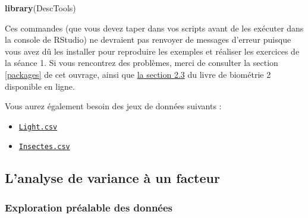 \documentclass[
  a4paper,
]{article}
\newenvironment{Shaded}{\begin{snugshade}}{\end{snugshade}}
\newcommand{\KeywordTok}[1]{\textcolor[rgb]{0.12,0.11,0.11}{\textbf{#1}}}
\newcommand{\NormalTok}[1]{\textcolor[rgb]{0.12,0.11,0.11}{#1}}
\providecommand{\tightlist}{%
  \setlength{\itemsep}{0pt}\setlength{\parskip}{0pt}}
\begin{document}
\begin{Shaded}
\begin{Highlighting}[]
\KeywordTok{library}\NormalTok{(DescTools)}
\end{Highlighting}
\end{Shaded}

Ces commandes (que vous devez taper dans vos scripts avant de les exécuter dans la console de RStudio) ne devraient pas renvoyer de messages d'erreur puisque vous avez dû les installer pour reproduire les exemples et réaliser les exercices de la séance 1. Si vous rencontrez des problèmes, merci de consulter la section \ref{packages} de cet ouvrage, ainsi que \href{https://besibo.github.io/Biometrie2/bases.html\#charger-un-package-en-memoire}{la section 2.3} du livre de biométrie 2 disponible en ligne.

Vous aurez également besoin des jeux de données suivants :

\begin{itemize}
\tightlist
\item
  \href{https://besibo.github.io/Biometrie3/data/Light.csv}{\texttt{Light.csv}}
\item
  \href{https://besibo.github.io/Biometrie3/data/Insectes.csv}{\texttt{Insectes.csv}}
\end{itemize}

\hypertarget{lanalyse-de-variance-uxe0-un-facteur}{%
\subsection{L'analyse de variance à un facteur}\label{lanalyse-de-variance-uxe0-un-facteur}}

\hypertarget{exploration-pruxe9alable-des-donnuxe9es-1}{%
\subsubsection{Exploration préalable des données}\label{exploration-pruxe9alable-des-donnuxe9es-1}}
\end{document}
